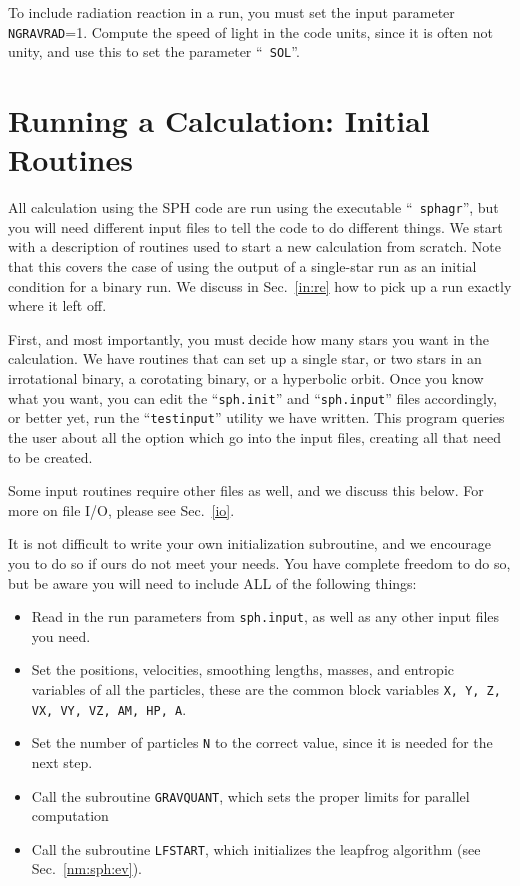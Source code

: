 To include radiation reaction in a run, you must set the input parameter
{\tt NGRAVRAD}=1.  Compute the speed of light in the code units, since
it is often not unity, and use this to set the parameter ``{\tt
SOL}''.

\newpage
\section{Running a Calculation: Initial Routines}
\label{in}
All calculation using the SPH code are run using the executable ``{\tt
sphagr}'', but you will need different input files to tell the code to
do different things.  We start with a description of routines used to
start a new calculation from scratch. Note that this covers the case
of using the output of a single-star run as an initial condition for a
binary run.  We discuss in Sec.~\ref{in:re} how to pick up a run exactly where
it left off.

First, and most importantly, you must decide how many stars you want
in the calculation.  We have routines that can set up a single star,
or two stars in an irrotational binary, a corotating binary, or a
hyperbolic orbit.  Once you know what you want, you can edit the
``{\tt sph.init}'' and ``{\tt sph.input}'' files accordingly, or
better yet, run the ``{\tt testinput}'' utility we have written.  This
program queries the user about all the option which go into the input
files, creating all that need to be created.

Some input routines require other files as well, and we discuss this
below.  For more on file I/O, please see Sec.~\ref{io}.

It is not difficult to write your own initialization subroutine, and
we encourage you to do so if ours do not meet your needs.  You have
complete freedom to do so, but be aware you will need to include ALL
of the following things:

\begin{itemize}
\item Read in the run parameters from {\tt sph.input}, as well as any
other input files you need.
\item Set the positions, velocities, smoothing lengths, masses, and
entropic variables of all the particles, these are the common block
variables {\tt X, Y, Z, VX, VY, VZ, AM, HP, A}.
\item Set the number of particles {\tt N} to the correct value, since
it is needed for the next step.
\item Call the subroutine {\tt GRAVQUANT}, which sets the proper
limits for parallel computation
\item Call the subroutine {\tt LFSTART}, which initializes the
leapfrog algorithm (see Sec.~\ref{nm:sph:ev}).
\end{itemize}

